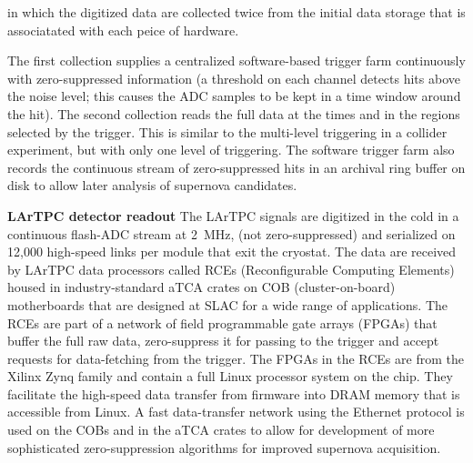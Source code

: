 in which the digitized data are collected twice from the initial data
storage that is associatated with each peice of hardware. 

The first collection
supplies a centralized software-based trigger farm continuously with
zero-suppressed information (a threshold on each channel detects hits
above the noise level; this causes the ADC samples to be kept in a
time window around the hit).  
The second collection reads the full data at the times and
in the regions %
selected by the
trigger. This is similar to the multi-level triggering in a collider experiment,
but with only one level of triggering.
The software trigger farm also
records the continuous stream of zero-suppressed hits in an archival
ring buffer on disk to allow later analysis of supernova candidates.

{\bf LArTPC detector readout} The LArTPC signals are digitized in the
cold in a
continuous flash-ADC stream at 2~MHz, (not zero-suppressed) and
serialized on 12,000 high-speed links per  module that exit the
cryostat.
The data
are received by LArTPC data processors called RCEs (Reconfigurable
Computing Elements) %
housed in
industry-standard aTCA crates on COB (cluster-on-board) motherboards that are designed at SLAC
for a wide range of applications.  The RCEs are part of a network of
field programmable gate arrays (FPGAs) that buffer the full raw data,
zero-suppress it for passing to the trigger and accept requests for
data-fetching from the trigger.  The FPGAs in the RCEs are from the
Xilinx Zynq family and contain a full Linux processor system on the
chip.  They facilitate the high-speed data transfer from firmware into
DRAM memory that is accessible from Linux.  A fast data-transfer
network using the Ethernet protocol is used on the COBs and in the
aTCA crates to allow for development of more sophisticated zero-suppression algorithms
for improved supernova acquisition.

